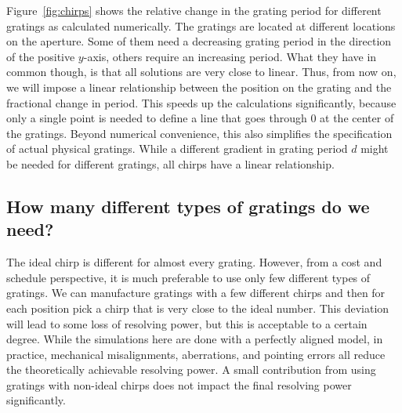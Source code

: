 \documentclass[]{spie}  %
\begin{document}
Figure~\ref{fig:chirps} shows the relative change in the grating period for different gratings as calculated numerically. The gratings are located at different locations on the aperture. Some of them need a decreasing grating period in the direction of the positive $y$-axis, others require an increasing period. What they have in common though, is that all solutions are very close to linear. Thus, from now on, we will impose a linear relationship between the position on the grating and the fractional change in period. This speeds up the calculations significantly, because only a single point is needed to define a line that goes through 0 at the center of the gratings. Beyond numerical convenience, this also simplifies the specification of actual physical gratings. While a different gradient in grating period $d$ might be needed for different gratings, all chirps have a linear relationship.


\subsection{How many different types of gratings do we need?}

The ideal chirp is different for almost every grating. However, from a cost and schedule perspective, it is much preferable to use only few different types of gratings. We can manufacture gratings with a few different chirps and then for each position pick a chirp that is very close to the ideal number. This deviation will lead to some loss of resolving power, but this is acceptable to a certain degree. While the simulations here are done with a perfectly aligned model, in practice, mechanical misalignments, aberrations, and pointing errors all reduce the theoretically achievable resolving power. A small contribution from using gratings with non-ideal chirps does not impact the final resolving power significantly.
\end{document}
